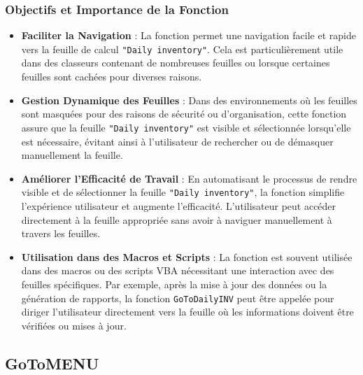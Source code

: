 \documentclass[a4paper, oneside, 12pt, final]{extreport}
\begin{document}
\subsubsection{Objectifs et Importance de la Fonction}
\begin{itemize}
    \item \textbf{Faciliter la Navigation} : La fonction permet une navigation facile et rapide vers la feuille de calcul \texttt{"Daily inventory"}. Cela est particulièrement utile dans des classeurs contenant de nombreuses feuilles ou lorsque certaines feuilles sont cachées pour diverses raisons.
    \item \textbf{Gestion Dynamique des Feuilles} : Dans des environnements où les feuilles sont masquées pour des raisons de sécurité ou d'organisation, cette fonction assure que la feuille \texttt{"Daily inventory"} est visible et sélectionnée lorsqu'elle est nécessaire, évitant ainsi à l'utilisateur de rechercher ou de démasquer manuellement la feuille.
    \item \textbf{Améliorer l'Efficacité de Travail} : En automatisant le processus de rendre visible et de sélectionner la feuille \texttt{"Daily inventory"}, la fonction simplifie l'expérience utilisateur et augmente l'efficacité. L'utilisateur peut accéder directement à la feuille appropriée sans avoir à naviguer manuellement à travers les feuilles.
    \item \textbf{Utilisation dans des Macros et Scripts} : La fonction est souvent utilisée dans des macros ou des scripts VBA nécessitant une interaction avec des feuilles spécifiques. Par exemple, après la mise à jour des données ou la génération de rapports, la fonction \texttt{GoToDailyINV} peut être appelée pour diriger l'utilisateur directement vers la feuille où les informations doivent être vérifiées ou mises à jour.
\end{itemize}
\subsection{GoToMENU}
\end{document}
